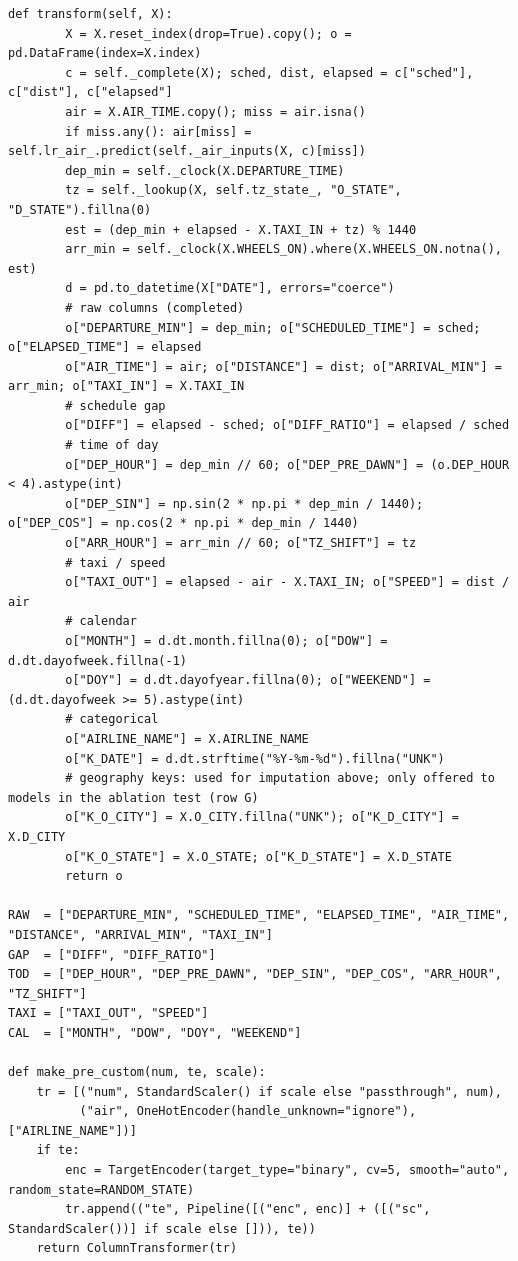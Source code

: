 \documentclass[12pt,a4paper]{article}
\begin{document}
\begin{lstlisting}[style=code]
    def transform(self, X):
        X = X.reset_index(drop=True).copy(); o = pd.DataFrame(index=X.index)
        c = self._complete(X); sched, dist, elapsed = c["sched"], c["dist"], c["elapsed"]
        air = X.AIR_TIME.copy(); miss = air.isna()
        if miss.any(): air[miss] = self.lr_air_.predict(self._air_inputs(X, c)[miss])
        dep_min = self._clock(X.DEPARTURE_TIME)
        tz = self._lookup(X, self.tz_state_, "O_STATE", "D_STATE").fillna(0)
        est = (dep_min + elapsed - X.TAXI_IN + tz) % 1440
        arr_min = self._clock(X.WHEELS_ON).where(X.WHEELS_ON.notna(), est)
        d = pd.to_datetime(X["DATE"], errors="coerce")
        # raw columns (completed)
        o["DEPARTURE_MIN"] = dep_min; o["SCHEDULED_TIME"] = sched; o["ELAPSED_TIME"] = elapsed
        o["AIR_TIME"] = air; o["DISTANCE"] = dist; o["ARRIVAL_MIN"] = arr_min; o["TAXI_IN"] = X.TAXI_IN
        # schedule gap
        o["DIFF"] = elapsed - sched; o["DIFF_RATIO"] = elapsed / sched
        # time of day
        o["DEP_HOUR"] = dep_min // 60; o["DEP_PRE_DAWN"] = (o.DEP_HOUR < 4).astype(int)
        o["DEP_SIN"] = np.sin(2 * np.pi * dep_min / 1440); o["DEP_COS"] = np.cos(2 * np.pi * dep_min / 1440)
        o["ARR_HOUR"] = arr_min // 60; o["TZ_SHIFT"] = tz
        # taxi / speed
        o["TAXI_OUT"] = elapsed - air - X.TAXI_IN; o["SPEED"] = dist / air
        # calendar
        o["MONTH"] = d.dt.month.fillna(0); o["DOW"] = d.dt.dayofweek.fillna(-1)
        o["DOY"] = d.dt.dayofyear.fillna(0); o["WEEKEND"] = (d.dt.dayofweek >= 5).astype(int)
        # categorical
        o["AIRLINE_NAME"] = X.AIRLINE_NAME
        o["K_DATE"] = d.dt.strftime("%Y-%m-%d").fillna("UNK")
        # geography keys: used for imputation above; only offered to models in the ablation test (row G)
        o["K_O_CITY"] = X.O_CITY.fillna("UNK"); o["K_D_CITY"] = X.D_CITY
        o["K_O_STATE"] = X.O_STATE; o["K_D_STATE"] = X.D_STATE
        return o

RAW  = ["DEPARTURE_MIN", "SCHEDULED_TIME", "ELAPSED_TIME", "AIR_TIME", "DISTANCE", "ARRIVAL_MIN", "TAXI_IN"]
GAP  = ["DIFF", "DIFF_RATIO"]
TOD  = ["DEP_HOUR", "DEP_PRE_DAWN", "DEP_SIN", "DEP_COS", "ARR_HOUR", "TZ_SHIFT"]
TAXI = ["TAXI_OUT", "SPEED"]
CAL  = ["MONTH", "DOW", "DOY", "WEEKEND"]

def make_pre_custom(num, te, scale):
    tr = [("num", StandardScaler() if scale else "passthrough", num),
          ("air", OneHotEncoder(handle_unknown="ignore"), ["AIRLINE_NAME"])]
    if te:
        enc = TargetEncoder(target_type="binary", cv=5, smooth="auto", random_state=RANDOM_STATE)
        tr.append(("te", Pipeline([("enc", enc)] + ([("sc", StandardScaler())] if scale else [])), te))
    return ColumnTransformer(tr)


\end{lstlisting}
\end{document}
